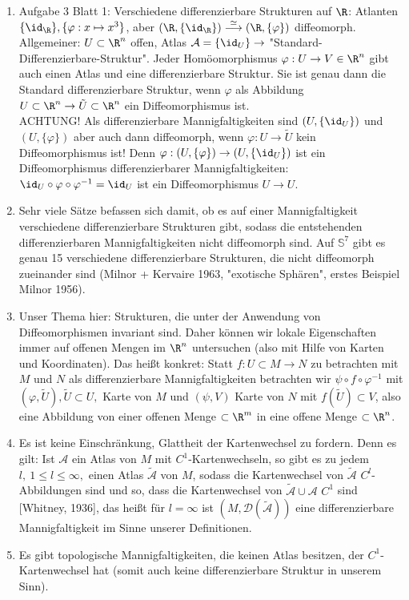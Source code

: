 \begin{rem}
	\begin{enumerate}[label = {\roman*})]
		\item Aufgabe 3 Blatt 1: Verschiedene differenzierbare Strukturen auf $\R$: Atlanten $ \{\id_\R\}, \{\varphi: x \mapsto x^3\} $, aber $ (\R,\{\id_\R\}) \overset{\simeq}{\longrightarrow} (\R,\{\varphi\}) $ diffeomorph.\\
			Allgemeiner: $ U \subset \R^n $ offen, Atlas $ \mathcal{A} = \{\id_U\} \rightarrow $ "Standard-Differenzierbare-Struktur". Jeder Homöomorphismus $ \varphi:  U \to V \in \R^n $ gibt auch einen Atlas und eine differenzierbare Struktur. Sie ist genau dann die Standard differenzierbare Struktur, wenn $\varphi$ als Abbildung $ U \subset \R^n \to \tilde{U} \subset \R^n $ ein Diffeomorphismus ist.\\
			ACHTUNG! Als differenzierbare Mannigfaltigkeiten sind $ (U,\{\id_U\}) $ und $(U,\{\varphi\})$ aber auch dann diffeomorph, wenn $\varphi: U \to \tilde{U}$ kein Diffeomorphismus ist! Denn $ \varphi: (U,\{\varphi\}) \to (U,\{\id_U\}) $ ist ein Diffeomorphismus differenzierbarer Mannigfaltigkeiten: $ \id_U \circ \varphi \circ \varphi^{-1} = \id_U $ ist ein Diffeomorphismus $ U \to U $.
		\item Sehr viele Sätze befassen sich damit, ob es auf einer Mannigfaltigkeit verschiedene differenzierbare Strukturen gibt, sodass die entstehenden differenzierbaren Mannigfaltigkeiten nicht diffeomorph sind. Auf $ \mathbb{S}^7 $ gibt es genau 15 verschiedene differenzierbare Strukturen, die nicht diffeomorph zueinander sind (Milnor + Kervaire 1963, "exotische Sphären", erstes Beispiel Milnor 1956).
		\item Unser Thema hier: Strukturen, die unter der Anwendung von Diffeomorphismen invariant sind. Daher können wir lokale Eigenschaften immer auf offenen Mengen im $\R^n$ untersuchen (also mit Hilfe von Karten und Koordinaten). Das heißt konkret: Statt $ f : U \subset M \to N $ zu betrachten mit $M$ und $N$ als differenzierbare Mannigfaltigkeiten betrachten wir $ \psi \circ f \circ \varphi^{-1} $ mit $ (\varphi,\tilde{U}), \tilde{U} \subset U, $ Karte von $M$ und $ (\psi,V) $ Karte von $N$ mit $ f(\tilde{U})\subset V $, also eine Abbildung von einer offenen Menge $\subset \R^m$ in eine offene Menge $\subset \R^n$.
		\item Es ist keine Einschränkung, Glattheit der Kartenwechsel zu fordern. Denn es gilt: Ist $\mathcal{A}$ ein Atlas von $M$ mit $C^1$-Kartenwechseln, so gibt es zu jedem $l,\ 1 \leq l \leq \infty,$ einen Atlas $ \tilde{\mathcal{A}} $ von $M$, sodass die Kartenwechsel von $\tilde{\mathcal{A}}$ $C^l$-Abbildungen sind und so, dass die Kartenwechsel von $\tilde{\mathcal{A}} \cup \mathcal{A}$ $C^1$ sind [Whitney, 1936], das heißt für $l = \infty$ ist $ (M,\mathcal{D}(\tilde{\mathcal{A}})) $ eine differenzierbare Mannigfaltigkeit im Sinne unserer Definitionen.
		\item Es gibt topologische Mannigfaltigkeiten, die keinen Atlas besitzen, der $C^1$-Kartenwechsel hat (somit auch keine differenzierbare Struktur in unserem Sinn).
	\end{enumerate}
\end{rem}

